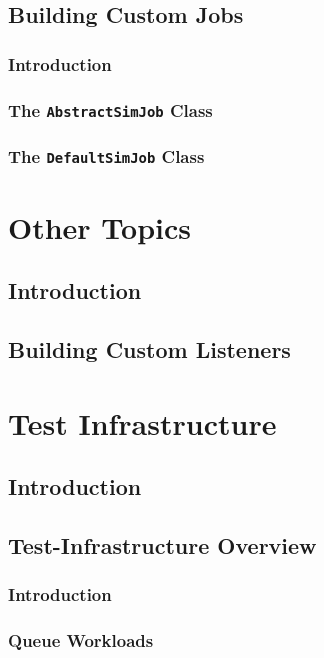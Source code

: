 \documentclass[12pt]{book}
\begin{document}
\section{Building Custom Jobs}

\subsection{Introduction}

\subsection{The \lstinline{AbstractSimJob} Class}

\subsection{The \lstinline{DefaultSimJob} Class}

\chapter{Other Topics}

\section{Introduction}

\section{Building Custom Listeners}

\chapter{Test Infrastructure}

\section{Introduction}

\section{Test-Infrastructure Overview}

\subsection{Introduction}

\subsection{Queue Workloads}
\end{document}
